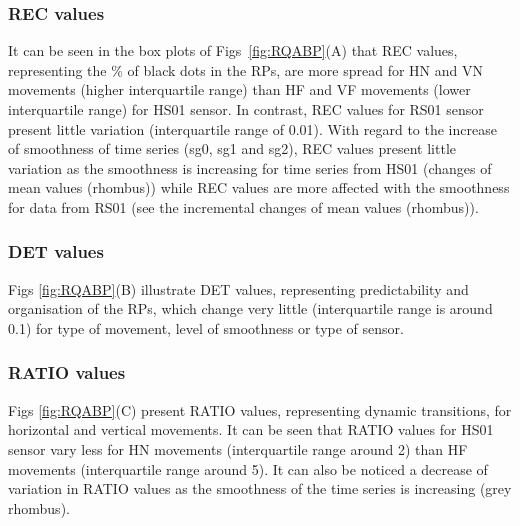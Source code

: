\documentclass[fleqn,10pt]{wlscirep}
\begin{document}
\subsubsection*{REC values}
It can be seen in the box plots of Figs~\ref{fig:RQABP}(A) that REC values, 
representing the \% of black dots in the RPs, 
are more spread for HN and VN movements (higher interquartile range) 
than HF and VF movements (lower interquartile range) for HS01 sensor. 
In contrast, REC values for RS01 sensor present little variation 
(interquartile range of 0.01).
With regard to the increase of smoothness of time series 
(sg0, sg1 and sg2), REC values present little 
variation as the smoothness is increasing for time series from HS01 
(changes of mean values (rhombus)) while REC values are more affected with 
the smoothness for data from RS01 
(see the incremental changes of mean values (rhombus)).


\subsubsection*{DET values}
Figs \ref{fig:RQABP}(B) illustrate DET values, 
representing predictability and organisation of the RPs, 
which change very little (interquartile range is around 0.1) 
for type of movement, level of smoothness or type of sensor.

\subsubsection*{RATIO values}
Figs \ref{fig:RQABP}(C) present RATIO values, representing dynamic transitions, 
for horizontal and vertical movements.
It can be seen that RATIO values for HS01 sensor vary less 
for HN movements (interquartile range around 2)
than HF movements (interquartile range around 5).
It can also be noticed a decrease of variation in RATIO values as the 
smoothness of the time series is increasing (grey rhombus).
\end{document}
